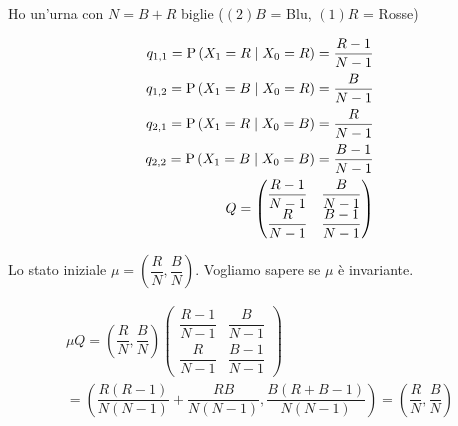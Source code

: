 \begin{exrc}
	Ho un'urna con $ N = B + R$ biglie ($(2) B $ = Blu, $ (1) R $ = Rosse)
	
	\begin{equation*}
	\begin{aligned}
	q_{1,1} = \text{P}\left(X_1 = R \mid X_0 = R\right) = \dfrac{R-1}{N-1} \\
	q_{1,2} = \text{P}\left(X_1 = B \mid X_0 = R\right) = \dfrac{B}{N-1} \\
	q_{2,1} = \text{P}\left(X_1 = R \mid X_0 = B\right) = \dfrac{R}{N-1} \\
	q_{2,2} = \text{P}\left(X_1 = B \mid X_0 = B\right) = \dfrac{B-1}{N-1} \\
	Q = \begin{pmatrix}
	\dfrac{R-1}{N-1} & \dfrac{B}{N-1} \\
	\dfrac{R}{N-1} & \dfrac{B-1}{N-1}
	\end{pmatrix}
	\end{aligned}
	\end{equation*}
	
	Lo stato iniziale $ \mu = \left(\dfrac{R}{N}, \dfrac{B}{N}\right) $. Vogliamo sapere se $ \mu $ \`e invariante.
	
	\begin{equation*}
	\begin{aligned}
	\mu Q = \left(\dfrac{R}{N}, \dfrac{B}{N}\right)\begin{pmatrix}
	\dfrac{R-1}{N-1} & \dfrac{B}{N-1} \\
	\dfrac{R}{N-1} & \dfrac{B-1}{N-1}
	\end{pmatrix} \\
	= \left(\dfrac{R(R-1)}{N(N-1)} + \dfrac{RB}{N(N-1)}, \dfrac{B(R+B-1)}{N(N-1)}\right) = \left(\dfrac{R}{N}, \dfrac{B}{N}\right)
	\end{aligned}
	\end{equation*}
\end{exrc}

